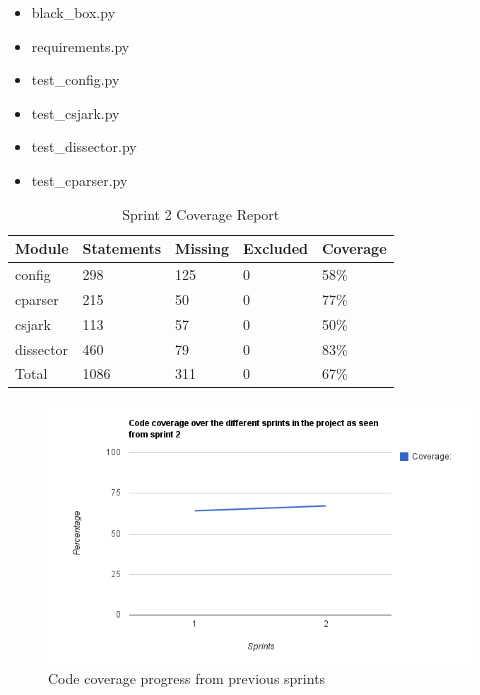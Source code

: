 \begin{itemize}
\item black\_box.py
\item requirements.py
\item test\_config.py
\item test\_csjark.py
\item test\_\gls{dissector}.py
\item test\_cparser.py
\end {itemize}

\begin{table}[!htb]\footnotesize\center
	\caption{Sprint 2 Coverage Report\label{tab:sp2CoverageReport}}
	\begin{tabular}{l l l l l}
		\toprule
		Module & Statements & Missing & Excluded & Coverage\\
		\midrule
		config & 298 & 125 & 0 & 58\%\ \\
		cparser & 215 & 50 & 0 & 77\%\ \\
		csjark & 113 & 57 & 0 & 50\%\ \\
		\gls{dissector} & 460 & 79 & 0 & 83\%\ \\
		Total & 1086 & 311 & 0 & 67\%\ \\
		\bottomrule
	\end{tabular}
\end{table}

\begin{figure}[ht]
	\center
	\includegraphics[width=\textwidth]{./sprints/img/sprint2_code_coverage_chart}
	\caption{Code coverage progress from previous sprints\label{fig:sp2CoverageChart}}
\end{figure}


 


